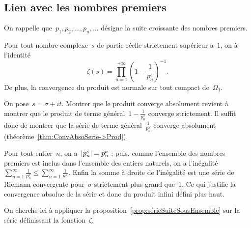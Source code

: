 	\subsection{Lien avec les nombres premiers}
		On rappelle que~$p_1,p_2,\ldots,p_n,\ldots$ désigne la suite croissante des nombres premiers.
		\begin{prop}\label{prop:produitEulerien}
			Pour tout nombre complexe~$s$ de partie réelle strictement supérieur a~$1$, on à l'identité
			\[
				\zeta(s) = \prod_{n=1}^{+\infty} \left( 1 - \frac{1}{p_n^s}\right)^{-1}.
			\]
			De plus, la convergence du produit est normale sur tout compact de~$\Omega_1$.
		\end{prop}
		\begin{dem}
			On pose~$s=\sigma+it$. Montrer que le produit converge absolument revient à montrer que le produit de terme général~$1-\frac{1}{p_n^s}$ converge strictement. Il suffit donc de montrer que la série de terme général~$\frac{1}{p_n^s}$ converge absolument (théorème~\ref{thm:ConvAbsoSerie->Prod}).
			
			Pour tout entier~$n$, on a~$\left\vert p_n^s\right\vert = p_n^\sigma$ ; puis, comme l'ensemble des nombres premiers est inclus dans l'ensemble des entiers naturels, on a l'inégalité~$\sum_{n=1}^\infty \frac{1}{p_n^\sigma} \leq \sum_{n=1}^\infty \frac{1}{n^\sigma}$. Enfin la somme à droite de l'inégalité est une série de Riemann convergente pour~$\sigma$ strictement plus grand que~$1$. Ce qui justifie la convergence absolue de la série et donc du produit infini défini plus haut.
			
			On cherche ici à appliquer la proposition~\ref{prop:sérieSuiteSousEnsemble} sur la série définissant la fonction~$\zeta$.
					

\end{dem}
